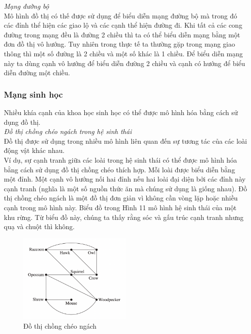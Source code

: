 \textit{Mạng đường bộ} \\
Mô hình đồ thị có thế được sử dụng để biểu diễn mạng đường bộ mà trong đó các đỉnh 
thể hiện các giao lộ và các cạnh thể hiện đường đi. Khi tất cả các cong đường trong mạng 
đều là đường 2 chiều thì ta có thể biểu diễn mạng bằng một đơn đồ thị vô hướng. Tuy 
nhiên trong thực tế ta thường gặp trong mạng giao thông thì một số đường là 2 chiều
và một số khác là 1 chiều. Để biểu diễn mạng này ta dùng cạnh vô hướng để biểu diễn 
đường 2 chiều và cạnh có hướng để biểu diễn đường một chiều.

\subsubsection{Mạng sinh học}
Nhiều khía cạnh của khoa học sinh học có thể được mô hình hóa bằng cách sử dụng đồ thị.\\
\textit{Đồ thị chồng chéo ngách trong hệ sinh thái} \\
Đồ thị được sử dụng trong nhiều mô hình liên quan đến sự tương tác của các loài động vật khác nhau. \\
Ví dụ, sự cạnh tranh giữa các loài trong hệ sinh thái có thể được mô hình hóa bằng cách sử dụng đồ thị chồng chéo thích hợp. Mỗi loài được biểu diễn bằng một đỉnh. Một cạnh vô hướng nối hai đỉnh nếu hai loài đại diện bởi các đỉnh này cạnh tranh (nghĩa là một số nguồn thức ăn mà chúng sử dụng là giống nhau). 
Đồ thị chồng chéo ngách là một đồ thị đơn giản vì không cần vòng lặp hoặc nhiều cạnh trong mô hình này. Biểu đồ trong Hình 11 mô hình hệ sinh thái của một khu rừng. Từ biểu đồ này, chúng ta thấy rằng sóc và gấu trúc cạnh tranh nhưng quạ và chuột thì không.
\begin{figure}[H] %
    \centering %
    \includegraphics[width=0.5\textwidth]{assets/dothi_chongcheongach.png} 
    \caption{Đồ thị chồng chéo ngách} %
\end{figure}

